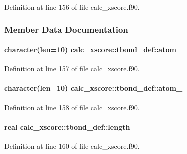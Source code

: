 Definition at line 156 of file calc\-\_\-xscore.\-f90.



\subsubsection{Member Data Documentation}
\hypertarget{structcalc__xscore_1_1tbond__def_a5f8dfaea0e174b6dff6ad684a7929bd3}{
\paragraph[{atom\-\_\-1}]{\setlength{\rightskip}{0pt plus 5cm}character(len=10) calc\-\_\-xscore\-::tbond\-\_\-def\-::atom\-\_}}\label{structcalc__xscore_1_1tbond__def_a5f8dfaea0e174b6dff6ad684a7929bd3}


Definition at line 157 of file calc\-\_\-xscore.\-f90.

\hypertarget{structcalc__xscore_1_1tbond__def_a790fc5d2038a9f1e17ec2423fd77b687}{
\paragraph[{atom\-\_\-2}]{\setlength{\rightskip}{0pt plus 5cm}character(len=10) calc\-\_\-xscore\-::tbond\-\_\-def\-::atom\-\_}}\label{structcalc__xscore_1_1tbond__def_a790fc5d2038a9f1e17ec2423fd77b687}


Definition at line 158 of file calc\-\_\-xscore.\-f90.

\hypertarget{structcalc__xscore_1_1tbond__def_ae468bd85b9bd983328b4b6ca91ffd270}{
\paragraph[{length}]{\setlength{\rightskip}{0pt plus 5cm}real calc\-\_\-xscore\-::tbond\-\_\-def\-::length}}\label{structcalc__xscore_1_1tbond__def_ae468bd85b9bd983328b4b6ca91ffd270}


Definition at line 160 of file calc\-\_\-xscore.\-f90.

